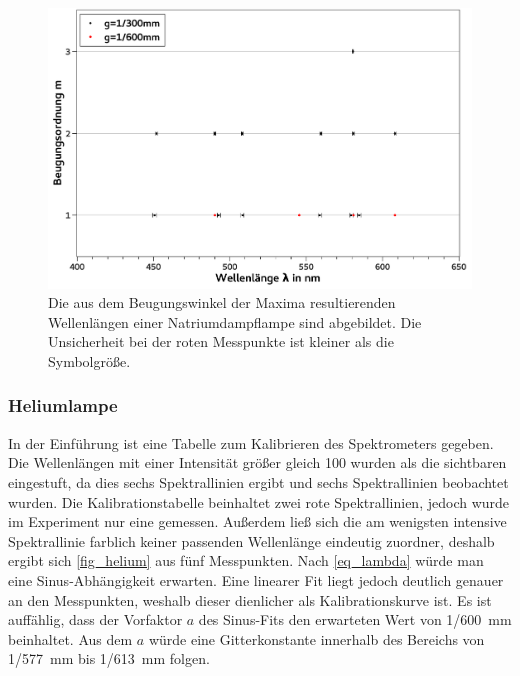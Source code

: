 \documentclass[
	a4paper,
	12pt,
	pagesize,
	ngerman
]{scrartcl}
\begin{document}
	\begin{figure}[H] 
		\includegraphics[width=1\textwidth]{fig_natrium} 
		\centering
		\caption{Die aus dem Beugungswinkel der Maxima resultierenden Wellenlängen einer Natriumdampflampe sind abgebildet.
		Die Unsicherheit bei der roten Messpunkte ist kleiner als die Symbolgröße.}
		\label{fig_natrium}
		\centering
	\end{figure}
	\subsubsection{Heliumlampe} \label{ss_helium}
	In der Einführung ist eine Tabelle zum Kalibrieren des Spektrometers gegeben. %
	Die Wellenlängen mit einer Intensität größer gleich 100 wurden als die sichtbaren eingestuft, da dies sechs Spektrallinien ergibt und sechs Spektrallinien beobachtet wurden.
	Die Kalibrationstabelle beinhaltet zwei rote Spektrallinien, jedoch wurde im Experiment nur eine gemessen.
	Außerdem ließ sich die am wenigsten intensive Spektrallinie farblich keiner passenden Wellenlänge eindeutig zuordner, deshalb ergibt sich \cref{fig_helium} aus fünf Messpunkten.
	Nach \cref{eq_lambda} würde man eine Sinus-Abhängigkeit erwarten. 
	Eine linearer Fit liegt jedoch deutlich genauer an den Messpunkten, weshalb dieser dienlicher als Kalibrationskurve ist.
	Es ist auffählig, dass der Vorfaktor $a$ des Sinus-Fits den erwarteten Wert von 1/\SI{600}{mm} beinhaltet. 
	Aus dem $a$ würde eine Gitterkonstante innerhalb des Bereichs von 1/\SI{577}{mm} bis 1/\SI{613}{mm} folgen.
	
\end{document}
